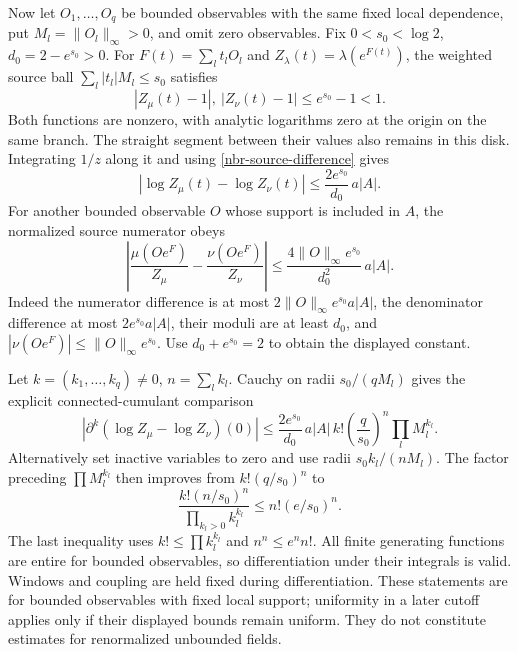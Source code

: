 Now let \(O_1,\ldots,O_q\) be bounded observables with the same fixed
local dependence, put \(M_l=\|O_l\|_\infty>0\), and omit zero
observables. Fix
\(0<s_0<\log2\), \(d_0=2-e^{s_0}>0\).
For \(F(t)=\sum_lt_lO_l\) and
\(Z_\lambda(t)=\lambda(e^{F(t)})\), the weighted source ball
\(\sum_l|t_l|M_l\le s_0\) satisfies
\begin{equation}
 |Z_\mu(t)-1|,\ |Z_\nu(t)-1|\le e^{s_0}-1<1.
 \label{nbr-source-disk}
\end{equation}
Both functions are nonzero, with analytic logarithms zero at the
origin on the same branch. The straight segment between their values
also remains in this disk. Integrating \(1/z\) along it and using
\eqref{nbr-source-difference} gives
\begin{equation}
 |\log Z_\mu(t)-\log Z_\nu(t)|
       \le\frac{2e^{s_0}}{d_0}\,a|A|.
 \label{nbr-log-source}
\end{equation}
For another bounded observable \(O\) whose support is included in
\(A\), the normalized source numerator obeys
\begin{equation}
 \left|\frac{\mu(Oe^F)}{Z_\mu}
             -\frac{\nu(Oe^F)}{Z_\nu}\right|
 \le\frac{4\|O\|_\infty e^{s_0}}{d_0^2}\,a|A|.
 \label{nbr-source-ratio}
\end{equation}
Indeed the numerator difference is at most
\(2\|O\|_\infty e^{s_0}a|A|\), the denominator difference at most
\(2e^{s_0}a|A|\), their moduli are at least \(d_0\), and
\(|\nu(Oe^F)|\le\|O\|_\infty e^{s_0}\). Use
\(d_0+e^{s_0}=2\) to obtain the displayed constant.

Let \(k=(k_1,\ldots,k_q)\ne0\), \(n=\sum_l k_l\).
Cauchy on radii \(s_0/(qM_l)\) gives the explicit connected-cumulant
comparison
\begin{equation}
 \left|\partial^k(\log Z_\mu-\log Z_\nu)(0)\right|
 \le\frac{2e^{s_0}}{d_0}\,a|A|\,
           k!\left(\frac q{s_0}\right)^n\prod_l M_l^{k_l}.
 \label{nbr-cumulant}
\end{equation}
Alternatively set inactive variables to zero and use radii
\(s_0k_l/(nM_l)\). The factor preceding \(\prod M_l^{k_l}\)
then improves from \(k!(q/s_0)^n\) to
\[
 \frac{k!(n/s_0)^n}{\prod_{k_l>0}k_l^{k_l}}
       \le n!(e/s_0)^n.
\]
The last inequality uses \(k!\le\prod k_l^{k_l}\) and
\(n^n\le e^n n!\). All finite generating functions are entire for
bounded observables, so differentiation under their integrals is
valid. Windows and coupling are held fixed during differentiation.
These statements are for bounded observables with fixed local support;
uniformity in a later cutoff applies only if their displayed bounds
remain uniform. They do not constitute estimates for renormalized
unbounded fields.

